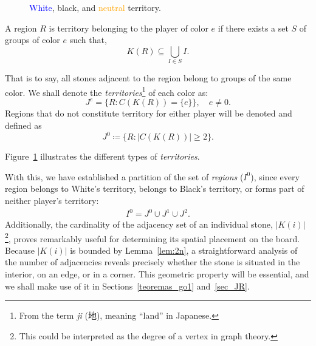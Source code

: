 \begin{figure}
	\caption{\textcolor{Blue}{White}, \textcolor{OliveGreen}{black}, and \textcolor{Orange}{neutral} territory.}
	\label{fig:territorios}
\end{figure}\begin{definition}[Territory]
	A region \(R\) is territory belonging to the player of color \(e\) if there exists a set \(S\) of groups of color \(e\) such that,
	\[K(R) \subseteq \bigcup_{I\in S} I.\]
\end{definition}

That is to say, all stones adjacent to the region belong to groups of the same color. We shall denote the \textit{territories}\footnote{From the term \textit{ji} (地), meaning ``land'' in Japanese.} of each color as:
$$J^{e} = \{R : C(K(R)) = \{e\}\}, \quad e \neq 0.$$
Regions that do not constitute territory for either player will be denoted and defined as
$$J^{0}\coloneqq \{R : |C(K(R))| \geq 2\}.$$

Figure~\ref{fig:territorios} illustrates the different types of \textit{territories}.


With this, we have established a partition of the set of \textit{regions} ($I^{0}$), since every region belongs to White's territory, belongs to Black's territory, or forms part of neither player's territory:
\begin{align*}
	I^{0} = J^{0} \cup J^{1} \cup J^{2}.
\end{align*}
\label{posicion_espacial}
Additionally, the cardinality of the adjacency set of an individual stone, $|K(i)|$\footnote{This could be interpreted as the degree of a vertex in graph theory.}, proves remarkably useful for determining its spatial placement on the board. Because $|K(i)|$ is bounded by Lemma~\ref{lem:2n}, a straightforward analysis of the number of adjacencies reveals precisely whether the stone is situated in the interior, on an edge, or in a corner. This geometric property will be essential, and we shall make use of it in Sections~\ref{teoremas_go1} and~\ref{sec_JR}.

